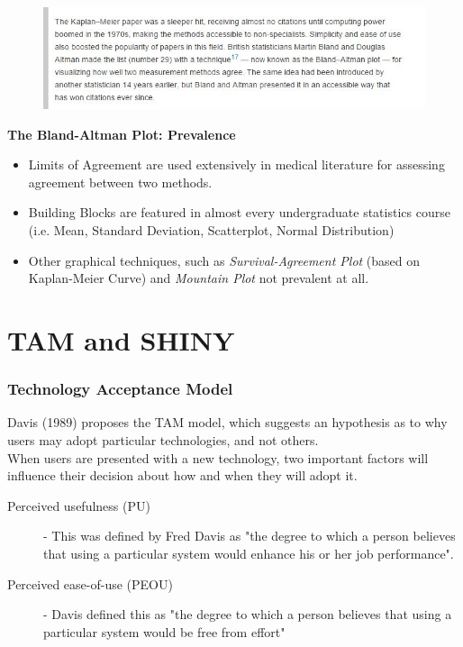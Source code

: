 \documentclass[compress]{beamer}        %
\makeatletter
\newcommand{\tcb}{\textcolor{beamer@blendedblue}}
\makeatother
\begin{document}
\begin{frame}
	\begin{figure}
		\centering
		\includegraphics[width=0.99\linewidth]{BACITE2}
		
		\label{fig:BACITE2}
	\end{figure}
	
\end{frame}

\begin{frame}{\bf \tcb{The Bland-Altman Plot: Prevalence}}
\begin{itemize}\itemsep0.7cm

\item Limits of Agreement are used extensively in medical literature for assessing agreement between two methods.
\item Building Blocks are featured in almost every undergraduate statistics course (i.e. Mean, Standard Deviation, Scatterplot, Normal Distribution)
\item Other graphical techniques, such as \textit{Survival-Agreement Plot} (based on Kaplan-Meier Curve) and \textit{Mountain Plot} not prevalent at all.
\end{itemize}
\end{frame}
\section{TAM and SHINY}
\begin{frame}
		\frametitle{Technology Acceptance Model}
	\vspace{-0.4cm}
Davis (1989) proposes the TAM model, which suggests an hypothesis as to why users may adopt particular technologies, and not others. \\ \bigskip
When users are presented with a new 
technology, two important factors will influence their decision about how and when they will adopt it.
\begin{description}
	\item[Perceived usefulness (PU)] - This was defined by Fred Davis as "the degree to which a person believes that using a particular system would enhance his or her job performance".
	\item[Perceived ease-of-use (PEOU)] - Davis defined this as "the degree to which a person believes that using a particular system would be free from effort" 
\end{description}
\end{frame}
\end{document}

